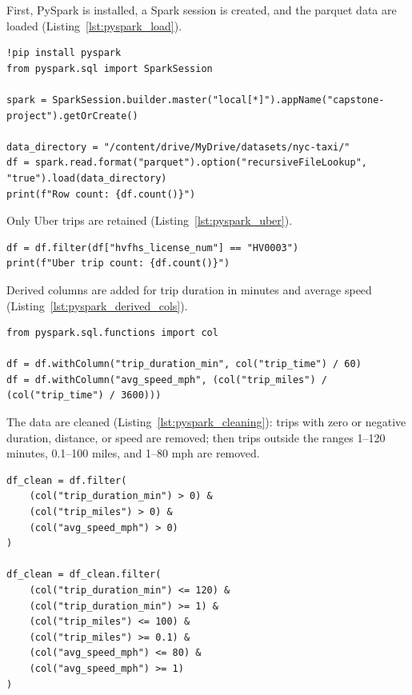 \documentclass[12pt, a4paper]{article}
\begin{document}
First, PySpark is installed, a Spark session is created, and the parquet data are loaded (Listing~\ref{lst:pyspark_load}).

\begin{lstlisting}[style=pystyle, caption={Spark session and loading FHV data from parquet}, label=lst:pyspark_load]
!pip install pyspark
from pyspark.sql import SparkSession

spark = SparkSession.builder.master("local[*]").appName("capstone-project").getOrCreate()

data_directory = "/content/drive/MyDrive/datasets/nyc-taxi/"
df = spark.read.format("parquet").option("recursiveFileLookup", "true").load(data_directory)
print(f"Row count: {df.count()}")
\end{lstlisting}

Only Uber trips are retained (Listing~\ref{lst:pyspark_uber}).

\begin{lstlisting}[style=pystyle, caption={Filter to Uber trips}, label=lst:pyspark_uber]
df = df.filter(df["hvfhs_license_num"] == "HV0003")
print(f"Uber trip count: {df.count()}")
\end{lstlisting}

Derived columns are added for trip duration in minutes and average speed (Listing~\ref{lst:pyspark_derived_cols}).

\begin{lstlisting}[style=pystyle, caption={Deriving trip duration and average speed columns}, label=lst:pyspark_derived_cols]
from pyspark.sql.functions import col

df = df.withColumn("trip_duration_min", col("trip_time") / 60)
df = df.withColumn("avg_speed_mph", (col("trip_miles") / (col("trip_time") / 3600)))
\end{lstlisting}

The data are cleaned (Listing~\ref{lst:pyspark_cleaning}): trips with zero or negative duration, distance, or speed are removed; then trips outside the ranges 1--120 minutes, 0.1--100 miles, and 1--80 mph are removed.

\begin{lstlisting}[style=pystyle, caption={Data cleaning}, label=lst:pyspark_cleaning]
df_clean = df.filter(
    (col("trip_duration_min") > 0) &
    (col("trip_miles") > 0) &
    (col("avg_speed_mph") > 0)
)

df_clean = df_clean.filter(
    (col("trip_duration_min") <= 120) &
    (col("trip_duration_min") >= 1) &
    (col("trip_miles") <= 100) &
    (col("trip_miles") >= 0.1) &
    (col("avg_speed_mph") <= 80) &
    (col("avg_speed_mph") >= 1)
)
\end{lstlisting}
\end{document}

